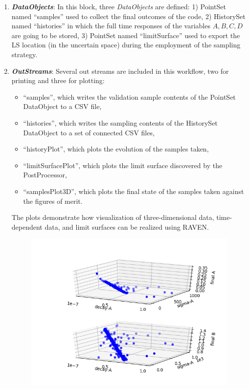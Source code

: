 \begin{enumerate}
   \item \textbf{\textit{DataObjects}}:
      In this block, three \textit{DataObjects} are defined: 1) PointSet
      named ``samples'' used to collect the final outcomes of the code, 2)
      HistorySet named ``histories'' in which the full time responses of the
      variables $A,B,C,D$ are going to be stored, 3) PointSet named
      ``limitSurface'' used  to export the LS location (in the uncertain space) during the employment of the sampling strategy.
   \item \textbf{\textit{OutStreams}}:
     Several out streams are included in this workflow, two for printing and three for plotting:
     \begin{itemize}
       \item ``samples'', which writes the validation sample contents of the  PointSet DataObject to a CSV file,
       \item ``histories'', which writes the sampling contents of the  HistorySet DataObject to a
         set of connected CSV files,
       \item ``historyPlot'', which plots the evolution of the samples taken,
       \item ``limitSurfacePlot'', which plots the limit surface discovered by the PostProcessor,
       \item ``samplesPlot3D'', which plots the final state of the samples taken against the figures of merit.
     \end{itemize}
     The plots demonstrate how visualization of three-dimensional data, time-dependent data, and limit
     surfaces can be realized using RAVEN.
 \begin{figure}[h!]
  \centering
  \includegraphics[scale=0.7]{../../tests/framework/user_guide/AdaptiveSamplingStrategies/gold/LSsearch/1-samplesPlot3D_scatter-scatter.png}

\end{figure}
\end{enumerate}

